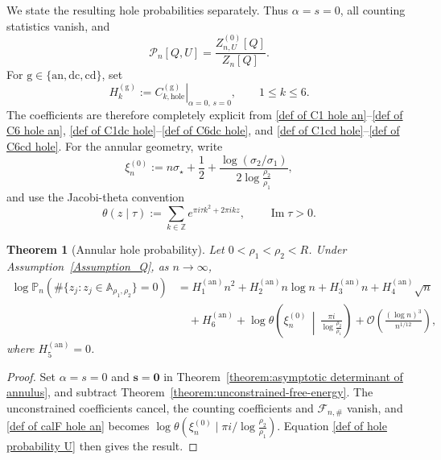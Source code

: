 \documentclass[a4paper]{article}
\newtheorem{theorem}{Theorem}[section]
\numberwithin{equation}{section}
\begin{document}
We state the resulting hole
probabilities separately.  Thus $\alpha=s=0$, all counting statistics vanish,
and
\[
\mathcal P_n[Q,U]=\frac{Z_{n,U}^{(0)}[Q]}{Z_n[Q]}.
\]
For $\mathrm g\in\{\mathrm{an},\mathrm{dc},\mathrm{cd}\}$, set
\begin{equation}
\label{def:H-hole-specialization}
H_k^{(\mathrm g)}
:=\left.C_{k,\mathrm{hole}}^{(\mathrm g)}\right|_{\alpha=0,\,s=0},
\qquad 1\leq k\leq6.
\end{equation}
The coefficients are therefore completely explicit from
\eqref{def of C1 hole an}--\eqref{def of C6 hole an},
\eqref{def of C1dc hole}--\eqref{def of C6dc hole}, and
\eqref{def of C1cd hole}--\eqref{def of C6cd hole}.  For the annular
geometry, write
\begin{equation}
\label{def:L-and-hole-phase}
\xi_n^{(0)}:=n\sigma_\star+\frac12
+\frac{\log(\sigma_2/\sigma_1)}{2\log\frac{\rho_2}{\rho_1}},
\end{equation}
and use the Jacobi-theta convention
\begin{equation}
\label{def:Jacobi-theta-convention}
\theta(z\mid\tau):=\sum_{k\in\mathbb Z}
e^{\pi i\tau k^2+2\pi i k z},
\qquad \operatorname{Im}\tau>0.
\end{equation}

\begin{theorem}[Annular hole probability]
\label{theorem:precise-annular-hole-probability}
Let $0<\rho_1<\rho_2<R$.  Under Assumption~\ref{Assumption_Q}, as
$n\to\infty$,
\begin{align}
\log\mathbb P_n\!\left(\#\{z_j:z_j\in \mathbb{A}_{\rho_1,\rho_2}\}=0\right)
&=H_1^{(\mathrm{an})}n^2
+H_2^{(\mathrm{an})}n\log n
+H_3^{(\mathrm{an})}n
+H_4^{(\mathrm{an})}\sqrt n
\nonumber\\
&\quad
+H_6^{(\mathrm{an})}
+\log\theta\!\left(\xi_n^{(0)}\,\middle|\,\frac{\pi i}{\log\frac{\rho_2}{\rho_1}}\right)
+\mathcal O\!\left(\frac{(\log n)^3}{n^{1/12}}\right),
\label{eq:precise-annular-hole-probability}
\end{align}
where $H_5^{(\mathrm{an})}=0$. 
\end{theorem}

\begin{proof}
Set $\alpha=s=0$ and $\boldsymbol s=\boldsymbol0$ in
Theorem~\ref{theorem:asymptotic determinant of annulus}, and subtract
Theorem~\ref{theorem:unconstrained-free-energy}.  The unconstrained
coefficients cancel, the counting coefficients and $\mathcal F_{n,\#}$
vanish, and \eqref{def of calF hole an} becomes
$\log\theta(\xi_n^{(0)}\mid\pi i/\log\frac{\rho_2}{\rho_1})$.  Equation
\eqref{def of hole probability U} then gives the result.
\end{proof}
\end{document}
